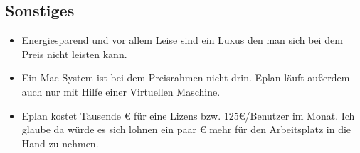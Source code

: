 \documentclass[11pt]{article}
\begin{document}
\subsection{Sonstiges}
\label{sec:orgb93b221}
\begin{itemize}
\item Energiesparend und vor allem Leise sind ein Luxus den man sich bei dem Preis nicht leisten kann.
\item Ein Mac System ist bei dem Preisrahmen nicht drin. Eplan läuft außerdem auch nur mit Hilfe einer Virtuellen Maschine.
\item Eplan kostet Tausende € für eine Lizens bzw. 125€/Benutzer im Monat. Ich glaube da würde es sich lohnen ein paar € mehr für den Arbeitsplatz in die Hand zu nehmen.
\end{itemize}
\end{document}

